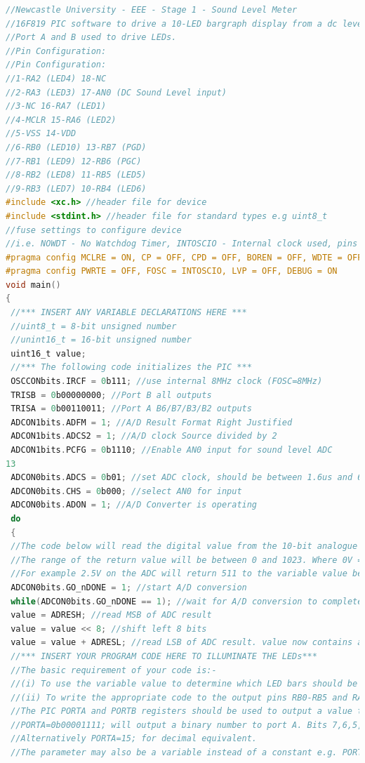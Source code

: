 \documentclass[10pt,a4paper]{article}
\begin{document}
\begin{lstlisting}[language= C]
//Newcastle University - EEE - Stage 1 - Sound Level Meter
//16F819 PIC software to drive a 10-LED bargraph display from a dc level on ADC input 0 (AN0).
//Port A and B used to drive LEDs.
//Pin Configuration:
//Pin Configuration:
//1-RA2 (LED4) 18-NC
//2-RA3 (LED3) 17-AN0 (DC Sound Level input)
//3-NC 16-RA7 (LED1)
//4-MCLR 15-RA6 (LED2)
//5-VSS 14-VDD
//6-RB0 (LED10) 13-RB7 (PGD)
//7-RB1 (LED9) 12-RB6 (PGC)
//8-RB2 (LED8) 11-RB5 (LED5)
//9-RB3 (LED7) 10-RB4 (LED6)
#include <xc.h> //header file for device
#include <stdint.h> //header file for standard types e.g uint8_t
//fuse settings to configure device
//i.e. NOWDT - No Watchdog Timer, INTOSCIO - Internal clock used, pins available for I/O
#pragma config MCLRE = ON, CP = OFF, CPD = OFF, BOREN = OFF, WDTE = OFF
#pragma config PWRTE = OFF, FOSC = INTOSCIO, LVP = OFF, DEBUG = ON
void main()
{
 //*** INSERT ANY VARIABLE DECLARATIONS HERE ***
 //uint8_t = 8-bit unsigned number
 //unint16_t = 16-bit unsigned number
 uint16_t value;
 //*** The following code initializes the PIC ***
 OSCCONbits.IRCF = 0b111; //use internal 8MHz clock (FOSC=8MHz)
 TRISB = 0b00000000; //Port B all outputs
 TRISA = 0b00110011; //Port A B6/B7/B3/B2 outputs
 ADCON1bits.ADFM = 1; //A/D Result Format Right Justified
 ADCON1bits.ADCS2 = 1; //A/D clock Source divided by 2
 ADCON1bits.PCFG = 0b1110; //Enable AN0 input for sound level ADC
13
 ADCON0bits.ADCS = 0b01; //set ADC clock, should be between 1.6us and 6.4us (1/8MHz x 16 = 2us)
 ADCON0bits.CHS = 0b000; //select AN0 for input
 ADCON0bits.ADON = 1; //A/D Converter is operating
 do
 {
 //The code below will read the digital value from the 10-bit analogue to digital converter.
 //The range of the return value will be between 0 and 1023. Where 0V = 0 and 5V = 1023.
 //For example 2.5V on the ADC will return 511 to the variable value below.
 ADCON0bits.GO_nDONE = 1; //start A/D conversion
 while(ADCON0bits.GO_nDONE == 1); //wait for A/D conversion to complete
 value = ADRESH; //read MSB of ADC result
 value = value << 8; //shift left 8 bits
 value = value + ADRESL; //read LSB of ADC result. value now contains a 10-bit ADC number
 //*** INSERT YOUR PROGRAM CODE HERE TO ILLUMINATE THE LEDs***
 //The basic requirement of your code is:-
 //(i) To use the variable value to determine which LED bars should be switched on.
 //(ii) To write the appropriate code to the output pins RB0-RB5 and RA2,RA3,RA6,RA7.
 //The PIC PORTA and PORTB registers should be used to output a value to the Port pins
 //PORTA=0b00001111; will output a binary number to port A. Bits 7,6,5,4=0 and Bits 3,2,1,0=1.
 //Alternatively PORTA=15; for decimal equivalent.
 //The parameter may also be a variable instead of a constant e.g. PORTA=value;
 

\end{lstlisting}
\end{document}
